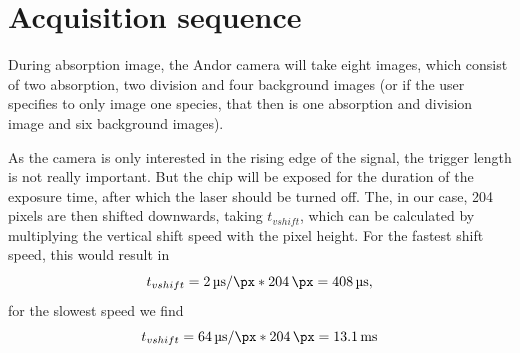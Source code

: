 \appendix
\chapter{Acquisition sequence}
\label{ch:acqseq}
During absorption image, the Andor camera will take eight images, which consist of two absorption, two division and four background images (or if the user specifies to only image one species, that then is one absorption and division image and six background images).

As the camera is only interested in the rising edge of the signal, the trigger length is not really important. But the chip will be exposed for the duration of the exposure time, after which the laser should be turned off. The, in our case, 204 pixels are then shifted downwards, taking $t_{vshift}$, which can be calculated by multiplying the vertical shift speed with the pixel height. For the fastest shift speed, this would result in
\begin{equation}
t_{vshift} = \SI{2}{\micro\second\per\px} * \SI{204}{\px} = \SI{408}{\micro\second},
\end{equation}
for the slowest speed we find
\begin{equation}
t_{vshift} = \SI{64}{\micro\second\per\px} * \SI{204}{\px} = \SI{13.1}{\milli\second}
\end{equation}


